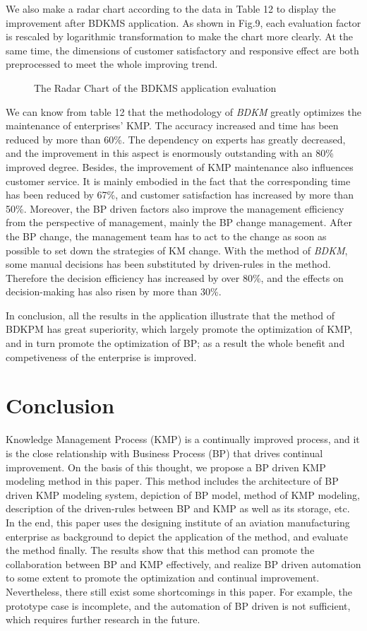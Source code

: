 \documentclass{elsarticle}
\begin{document}
{We also make a
radar chart according to the data in Table 12 to display the
improvement after BDKMS application. As shown in Fig.9, each
evaluation factor is rescaled by logarithmic transformation to make
the chart more clearly. At the same time, the dimensions of customer
satisfactory and responsive effect are both preprocessed to meet the
whole improving trend.
\begin{figure}[!hb]
  \centering
  \scalebox{0.35}{\texttt{[image: 09]}}
  \caption{The Radar Chart of the BDKMS application evaluation}
\end{figure}
 We can know
from table 12 that the methodology of \textrm{\textit{BDKM}}\textrm{
greatly optimizes the maintenance of enterprises' KMP.
The accuracy increased and time has been
reduced by more than 60\%. The dependency on experts has greatly
decreased, and the improvement in this aspect is enormously outstanding
with an 80\% improved degree. Besides, the
improvement of KMP maintenance also influences customer service. It is
mainly embodied in the fact that the corresponding time has been
reduced by 67\%, and customer satisfaction has increased by more than
50\%. Moreover, the BP driven factors also improve the management
efficiency from the perspective of management, mainly the BP change
management. After the BP change, the management team has to act to the
change as soon as possible to set down the strategies of KM change.
With the method of }\textrm{\textit{BDKM}}\textrm{, some manual
decisions has been substituted by driven-rules in the method. Therefore
the decision efficiency has increased by over 80\%, and the effects on
decision-making has also risen by more than 30\%.}


In conclusion, all the results in the application illustrate that the
method of BDKPM has great superiority, which largely promote the
optimization of KMP, and in turn promote the optimization of BP; as a
result the whole benefit and competiveness of the enterprise is
improved.

\section{Conclusion}
\label{sec:conclusion-1}

\textrm{Knowledge Management Process (KMP) is a continually improved
process, and it is the close relationship with Business Process (BP)
that drives continual improvement. On the basis of this thought, we
propose a BP driven KMP modeling method in this paper. This method
includes the architecture of BP driven KMP modeling system, depiction
of BP model, method of KMP modeling, description of the driven-rules
between BP and KMP as well as its storage, etc. In the end, this paper
uses the designing institute of an aviation manufacturing enterprise as
background to depict the application of the method, and evaluate the
method finally. The results show that this method can promote the
collaboration between BP and KMP effectively, and realize BP driven
automation to some extent to promote the optimization and continual
improvement. Nevertheless, there still exist some shortcomings in this
paper. For example, the prototype case is incomplete, and the
automation of BP driven is not sufficient, which requires further
research in the future.}


}
\end{document}
